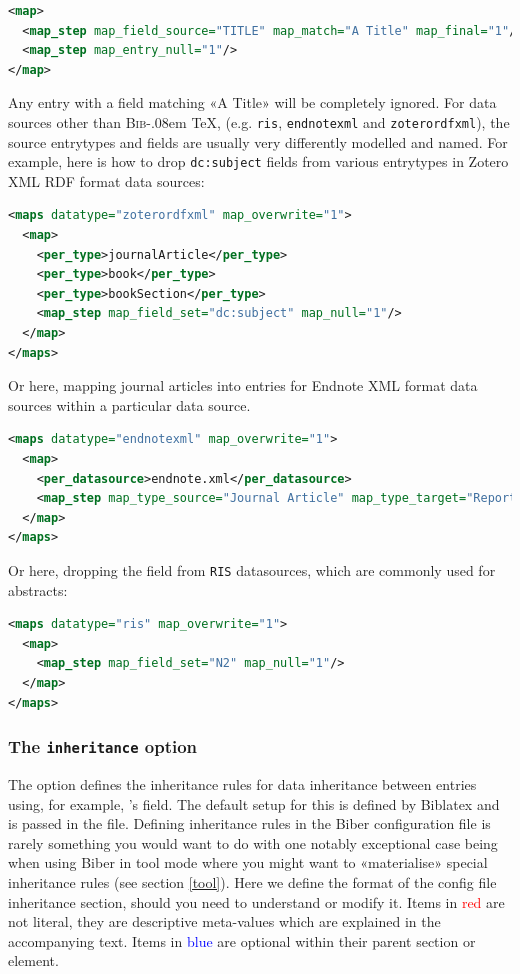 \documentclass{ltxdockit}
\def\BibTeX{\textsc{Bib}\kern-.08em \TeX}
\newcommand*{\biber}{Biber\xspace}
\newcommand*{\biblatex}{Biblatex\xspace}
\begin{document}
\begin{lstlisting}[language=xml,escapechar=;,mathescape=true]
<map>
  <map_step map_field_source="TITLE" map_match="A Title" map_final="1"/>
  <map_step map_entry_null="1"/>
</map>
\end{lstlisting}

\noindent Any entry with a  field matching «A Title»
will be completely ignored.
\bigskip
{}
For data sources other than \BibTeX, (e.g. \verb+ris+, \verb+endnotexml+
and \verb+zoterordfxml+), the source entrytypes and fields are usually very
differently modelled and named. For example, here is how to drop
\verb+dc:subject+ fields from various entrytypes in Zotero XML RDF format data
sources:

\begin{lstlisting}[language=xml,escapechar=+,mathescape=true]
<maps datatype="zoterordfxml" map_overwrite="1">
  <map>
    <per_type>journalArticle</per_type>
    <per_type>book</per_type>
    <per_type>bookSection</per_type>
    <map_step map_field_set="dc:subject" map_null="1"/>
  </map>
</maps>
\end{lstlisting}

\noindent Or here, mapping journal articles into  entries for
Endnote XML format data sources within a particular data source.

\begin{lstlisting}[language=xml,escapechar=+,mathescape=true]
<maps datatype="endnotexml" map_overwrite="1">
  <map>
    <per_datasource>endnote.xml</per_datasource>
    <map_step map_type_source="Journal Article" map_type_target="Report"/>
  </map>
</maps>
\end{lstlisting}

\noindent Or here, dropping the  field from \verb+RIS+
datasources, which are commonly used for abstracts:

\begin{lstlisting}[language=xml,escapechar=+,mathescape=true]
<maps datatype="ris" map_overwrite="1">
  <map>
    <map_step map_field_set="N2" map_null="1"/>
  </map>
</maps>
\end{lstlisting}
\bigskip
\subsubsection{The \texttt{inheritance} option}\label{inheritance}

The  option defines the inheritance rules for data
inheritance between entries using, for example, \bibtex's
 field. The default setup for this is defined by
\biblatex and is passed in the  file. Defining inheritance rules
in the \biber configuration file is rarely something you would want to do
with one notably exceptional case being when using \biber in tool mode
where you might want to «materialise» special inheritance rules (see
section \ref{tool}). Here we define the format of the config file
inheritance section, should you need to understand or modify it. Items in
\textcolor{red}{red} are not literal, they are descriptive meta-values
which are explained in the accompanying text. Items in
\textcolor{blue}{blue} are optional within their parent section or element.
\end{document}

